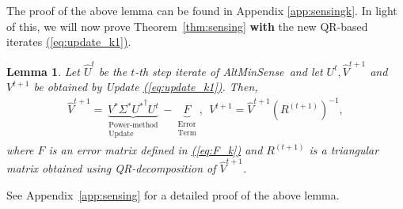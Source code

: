\documentclass[11pt]{article}
\renewcommand{\eqref}[1]{\hyperref[#1]{(\ref*{#1})}}
\theoremstyle{plain}
\newtheorem{lemma}[theorem]{Lemma}
\theoremstyle{definition}
\newcommand{\R}{\mathbb{R}}
\newcommand{\Vt}{V^{t+1}}
\newcommand{\Ut}{U^{t}}
\newcommand{\Uht}{\widehat{U}^{t}}
\newcommand{\as}{AltMinSense\ }
\begin{document}
The proof of the above lemma can be found in Appendix \ref{app:sensingk}. In light of this, we will now prove Theorem~\ref{thm:sensing} {\bf with} the new QR-based iterates \eqref{eq:update_k1}.

\begin{lemma}\label{lemma:sensing-updateeqn1}
  Let $\Uht$ be the $t$-th step iterate of \as and let $\Ut, \widehat{V}^{t+1}$ and $\Vt$ be obtained by Update \eqref{eq:update_k1}. Then, 
\begin{align}
  \widehat{V}^{t+1} = \underbrace{V^*\Sigma^*{U^*}^\dag  U^{t}}_{\substack{\text{Power-method}\\ \text{Update}}} - \underbrace{F}_{\substack{\text{Error}\\ \text{Term}}},\ \ 
  V^{t+1}=\widehat{V}^{t+1}(R^{(t+1)})^{-1},\label{eq:update_k}
\end{align}
where $F$ is an error matrix defined in \eqref{eq:F_k} and $R^{(t+1)}$ is a triangular matrix obtained using QR-decomposition of $\widehat{V}^{t+1}$. 
\end{lemma}
See Appendix~\ref{app:sensing} for a detailed proof of the above lemma. 
\end{document}
